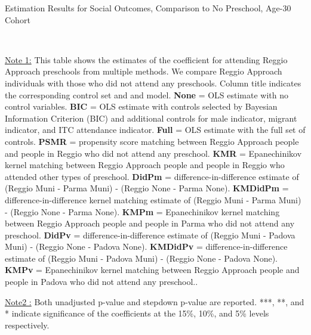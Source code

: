 \begin{table}[H] \caption{Estimation Results for Social Outcomes, Comparison to No Preschool, Age-30 Cohort} \label{ols-S-adult30-reg-none}
\scalebox{0.6}{}
\vspace{1ex} \\
\footnotesize\raggedright{\underline{Note 1:} This table shows the estimates of the coefficient for attending Reggio Approach preschools from multiple methods. We compare Reggio Approach individuals with those who did not attend any preschools. Column title indicates the corresponding control set and and model. \textbf{None} = OLS estimate with no control variables. \textbf{BIC} = OLS estimate with controls selected by Bayesian Information Criterion (BIC) and additional controls for male indicator, migrant indicator, and ITC attendance indicator. \textbf{Full} = OLS estimate with the full set of controls. \textbf{PSMR} =  propensity score matching between Reggio Approach people and people in Reggio who did not attend any preschool. \textbf{KMR} = Epanechinikov kernel matching between Reggio Approach people and people in Reggio who attended other types of preschool. \textbf{DidPm} = difference-in-difference estimate of (Reggio Muni - Parma Muni) - (Reggio None - Parma None). \textbf{KMDidPm} = difference-in-difference kernel matching estimate of (Reggio Muni - Parma Muni) - (Reggio None - Parma None). \textbf{KMPm} = Epanechinikov kernel matching between Reggio Approach people and people in Parma who did not attend any preschool. \textbf{DidPv} = difference-in-difference estimate of (Reggio Muni - Padova Muni) - (Reggio None - Padova None). \textbf{KMDidPv} = difference-in-difference estimate of (Reggio Muni - Padova Muni) - (Reggio None - Padova None). \textbf{KMPv} = Epanechinikov kernel matching between Reggio Approach people and people in Padova who did not attend any preschool..}

\footnotesize\raggedright{\underline{Note2 :} Both unadjusted p-value and stepdown p-value are reported. ***, **, and * indicate significance of the coefficients at the 15\%, 10\%, and 5\% levels respectively.}
\end{table}













